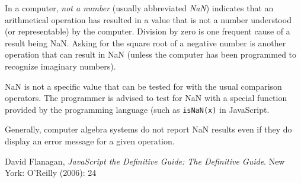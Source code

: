 \documentclass[12pt]{article}
\begin{document}
In a computer, {\em not a number} (usually abbreviated {\em NaN}) indicates that an arithmetical operation has resulted in a value that is not a number understood (or representable) by the computer. Division by zero is one frequent cause of a result being NaN. Asking for the square root of a negative number is another operation that can result in NaN (unless the computer has been programmed to recognize imaginary numbers).

NaN is not a specific value that can be tested for with the usual comparison operators. The programmer is advised to test for NaN with a special function provided by the programming language (such as \verb=isNaN(x)= in JavaScript.

Generally, computer algebra systems do not report NaN results even if they do display an error message for a given operation.

\begin{thebibliography}{1}
 David Flanagan, {\it JavaScript the Definitive Guide: The Definitive Guide}. New York: O'Reilly (2006): 24
\end{thebibliography}
\end{document}

